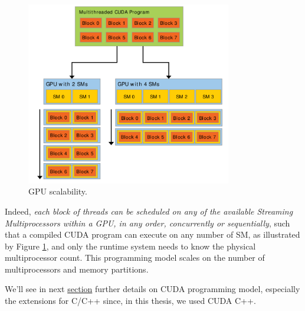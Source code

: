 	\begin{figure}[H]
		\centering
		\includegraphics[width=0.8\textwidth]{images/cudaSMs.png}
		\caption{GPU scalability.}
		\label{fig:cudaSM}
	\end{figure}
	Indeed, \textit{each block of threads can be scheduled on any of the available Streaming Multiprocessors within a GPU, in any order, concurrently or sequentially}, such that a compiled CUDA program can execute on any number of SM, as illustrated by Figure \ref{fig:cudaSM}, and only the runtime system needs to know the physical multiprocessor count.
	This programming model scales on the number of multiprocessors and memory partitions\cite{cudaguide}. 
	
	We'll see in next \hyperref[sect:CUDAcpp]{section} further details on CUDA programming model, especially the extensions for C/C++ since, in this thesis, we used CUDA C++.
	
